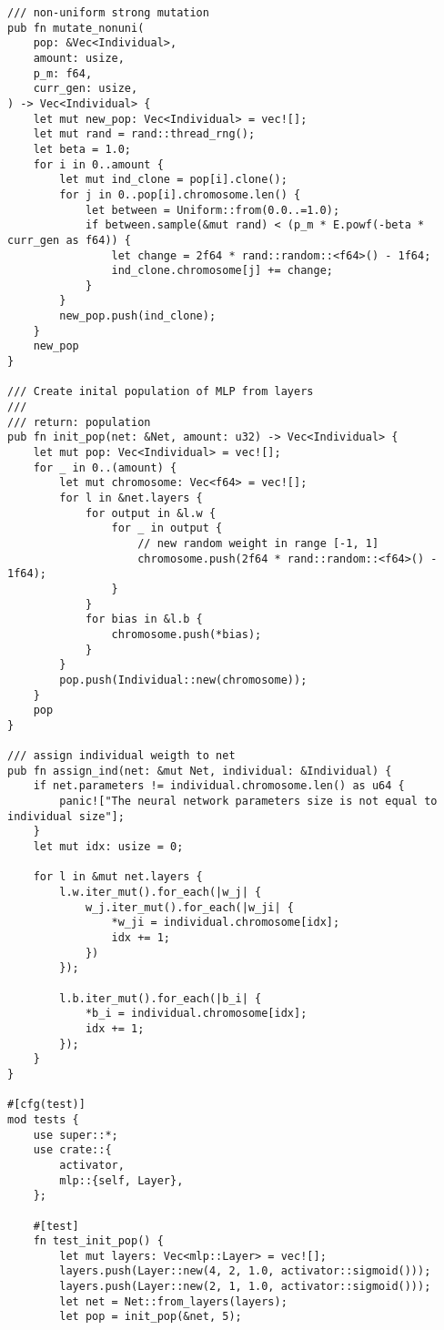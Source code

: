 \begin{code}
\begin{verbatim}
/// non-uniform strong mutation
pub fn mutate_nonuni(
    pop: &Vec<Individual>,
    amount: usize,
    p_m: f64,
    curr_gen: usize,
) -> Vec<Individual> {
    let mut new_pop: Vec<Individual> = vec![];
    let mut rand = rand::thread_rng();
    let beta = 1.0;
    for i in 0..amount {
        let mut ind_clone = pop[i].clone();
        for j in 0..pop[i].chromosome.len() {
            let between = Uniform::from(0.0..=1.0);
            if between.sample(&mut rand) < (p_m * E.powf(-beta * curr_gen as f64)) {
                let change = 2f64 * rand::random::<f64>() - 1f64;
                ind_clone.chromosome[j] += change;
            }
        }
        new_pop.push(ind_clone);
    }
    new_pop
}

/// Create inital population of MLP from layers
///
/// return: population
pub fn init_pop(net: &Net, amount: u32) -> Vec<Individual> {
    let mut pop: Vec<Individual> = vec![];
    for _ in 0..(amount) {
        let mut chromosome: Vec<f64> = vec![];
        for l in &net.layers {
            for output in &l.w {
                for _ in output {
                    // new random weight in range [-1, 1]
                    chromosome.push(2f64 * rand::random::<f64>() - 1f64);
                }
            }
            for bias in &l.b {
                chromosome.push(*bias);
            }
        }
        pop.push(Individual::new(chromosome));
    }
    pop
}

/// assign individual weigth to net
pub fn assign_ind(net: &mut Net, individual: &Individual) {
    if net.parameters != individual.chromosome.len() as u64 {
        panic!["The neural network parameters size is not equal to individual size"];
    }
    let mut idx: usize = 0;

    for l in &mut net.layers {
        l.w.iter_mut().for_each(|w_j| {
            w_j.iter_mut().for_each(|w_ji| {
                *w_ji = individual.chromosome[idx];
                idx += 1;
            })
        });

        l.b.iter_mut().for_each(|b_i| {
            *b_i = individual.chromosome[idx];
            idx += 1;
        });
    }
}

#[cfg(test)]
mod tests {
    use super::*;
    use crate::{
        activator,
        mlp::{self, Layer},
    };

    #[test]
    fn test_init_pop() {
        let mut layers: Vec<mlp::Layer> = vec![];
        layers.push(Layer::new(4, 2, 1.0, activator::sigmoid()));
        layers.push(Layer::new(2, 1, 1.0, activator::sigmoid()));
        let net = Net::from_layers(layers);
        let pop = init_pop(&net, 5);


\end{verbatim}
\end{code}
